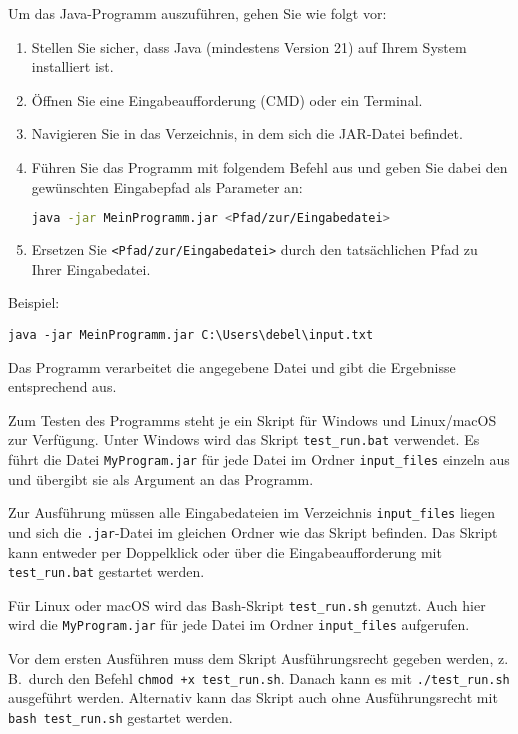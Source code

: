 \documentclass[a4paper,12pt]{report}
\begin{document}
Um das Java-Programm auszuführen, gehen Sie wie folgt vor:

\begin{enumerate}
    \item Stellen Sie sicher, dass Java (mindestens Version 21) auf Ihrem System installiert ist.
    \item Öffnen Sie eine Eingabeaufforderung (CMD) oder ein Terminal.
    \item Navigieren Sie in das Verzeichnis, in dem sich die JAR-Datei befindet.
    \item Führen Sie das Programm mit folgendem Befehl aus und geben Sie dabei den gewünschten Eingabepfad als Parameter an:
    \begin{lstlisting}[language=bash]
    java -jar MeinProgramm.jar <Pfad/zur/Eingabedatei>
    \end{lstlisting}
    \item Ersetzen Sie \texttt{<Pfad/zur/Eingabedatei>} durch den tatsächlichen Pfad zu Ihrer Eingabedatei.
\end{enumerate}

Beispiel:


\texttt{java -jar MeinProgramm.jar C:\textbackslash Users\textbackslash debel\textbackslash input.txt}


Das Programm verarbeitet die angegebene Datei und gibt die Ergebnisse entsprechend aus.

Zum Testen des Programms steht je ein Skript für Windows und Linux/macOS zur Verfügung. Unter Windows wird das Skript \texttt{test\_run.bat} verwendet.
Es führt die Datei \texttt{MyProgram.jar} für jede Datei im Ordner \texttt{input\_files} einzeln aus und übergibt sie als Argument an das Programm.

Zur Ausführung müssen alle Eingabedateien im Verzeichnis \texttt{input\_files} liegen und sich die \texttt{.jar}-Datei im gleichen Ordner wie das Skript befinden.
Das Skript kann entweder per Doppelklick oder über die Eingabeaufforderung mit \texttt{test\_run.bat} gestartet werden.

Für Linux oder macOS wird das Bash-Skript \texttt{test\_run.sh} genutzt. Auch hier wird die \texttt{MyProgram.jar} für jede Datei im Ordner \texttt{input\_files} aufgerufen.

Vor dem ersten Ausführen muss dem Skript Ausführungsrecht gegeben werden, z.\,B.\ durch den Befehl \texttt{chmod +x test\_run.sh}. Danach kann es mit \texttt{./test\_run.sh} ausgeführt werden.
Alternativ kann das Skript auch ohne Ausführungsrecht mit \texttt{bash test\_run.sh} gestartet werden.
\end{document}
